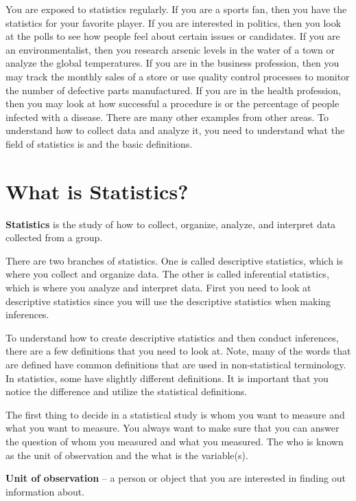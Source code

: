 \documentclass[
]{book}
\begin{document}
You are exposed to statistics regularly. If you are a sports fan, then you have the statistics for your favorite player. If you are interested in politics, then you look at the polls to see how people feel about certain issues or candidates. If you are an environmentalist, then you research arsenic levels in the water of a town or analyze the global temperatures. If you are in the business profession, then you may track the monthly sales of a store or use quality control processes to monitor the number of defective parts manufactured. If you are in the health profession, then you may look at how successful a procedure is or the percentage of people infected with a disease. There are many other examples from other areas. To understand how to collect data and analyze it, you need to understand what the field of statistics is and the basic definitions.

\hypertarget{what-is-statistics}{%
\section{What is Statistics?}\label{what-is-statistics}}

\textbf{Statistics} is the study of how to collect, organize, analyze, and interpret data collected from a group.

There are two branches of statistics. One is called descriptive statistics, which is where you collect and organize data. The other is called inferential statistics, which is where you analyze and interpret data. First you need to look at descriptive statistics since you will use the descriptive statistics when making inferences.

To understand how to create descriptive statistics and then conduct inferences, there are a few definitions that you need to look at. Note, many of the words that are defined have common definitions that are used in non-statistical terminology. In statistics, some have slightly different definitions. It is important that you notice the difference and utilize the statistical definitions.

The first thing to decide in a statistical study is whom you want to measure and what you want to measure. You always want to make sure that you can answer the question of whom you measured and what you measured. The who is known as the unit of observation and the what is the variable(s).

\textbf{Unit of observation} -- a person or object that you are interested in finding out information about.
\end{document}
